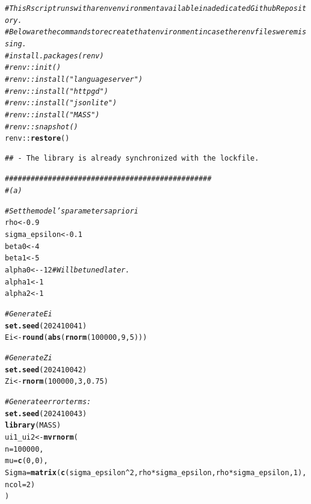 \documentclass{article}\usepackage[]{graphicx}\usepackage[]{xcolor}
\makeatletter
\newcommand{\hlnum}[1]{\textcolor[rgb]{0.686,0.059,0.569}{#1}}%
\newcommand{\hlcom}[1]{\textcolor[rgb]{0.678,0.584,0.686}{\textit{#1}}}%
\newcommand{\hlopt}[1]{\textcolor[rgb]{0,0,0}{#1}}%
\newcommand{\hldef}[1]{\textcolor[rgb]{0.345,0.345,0.345}{#1}}%
\newcommand{\hlkwb}[1]{\textcolor[rgb]{0.69,0.353,0.396}{#1}}%
\newcommand{\hlkwc}[1]{\textcolor[rgb]{0.333,0.667,0.333}{#1}}%
\newcommand{\hlkwd}[1]{\textcolor[rgb]{0.737,0.353,0.396}{\textbf{#1}}}%
\newenvironment{kframe}{%
 \def\at@end@of@kframe{}%
 \ifinner\ifhmode%
  \def\at@end@of@kframe{\end{minipage}}%
  \begin{minipage}{\columnwidth}%
 \fi\fi%
 \def\FrameCommand##1{\hskip\@totalleftmargin \hskip-\fboxsep
 \colorbox{shadecolor}{##1}\hskip-\fboxsep
     \hskip-\linewidth \hskip-\@totalleftmargin \hskip\columnwidth}%
 \MakeFramed {\advance\hsize-\width
   \@totalleftmargin\z@ \linewidth\hsize
   \@setminipage}}%
 {\par\unskip\endMakeFramed%
 \at@end@of@kframe}
\newenvironment{knitrout}{}{} %
\makeatother
\begin{document}
\begin{knitrout}
\color{fgcolor}\begin{kframe}
\begin{alltt}
\hlcom{# This R script runs with a renv environment available in a dedicated Github Repository.}
\hlcom{# Below are the commands to recreate that environment in case the renv files were missing.}
\hlcom{#install.packages(renv)}
\hlcom{#renv::init()}
\hlcom{#renv::install("languageserver")}
\hlcom{#renv::install("httpgd")}
\hlcom{#renv::install("jsonlite")}
\hlcom{#renv::install("MASS")}
\hlcom{#renv::snapshot()}
\hldef{renv}\hlopt{::}\hlkwd{restore}\hldef{()}
\end{alltt}
\begin{verbatim}
## - The library is already synchronized with the lockfile.
\end{verbatim}
\begin{alltt}
\hlcom{################################################}
\hlcom{# (a)}

\hlcom{# Set the model's parameters a priori}
\hldef{rho}           \hlkwb{<-} \hlnum{0.9}
\hldef{sigma_epsilon} \hlkwb{<-} \hlnum{0.1}
\hldef{beta0}         \hlkwb{<-} \hlnum{4}
\hldef{beta1}         \hlkwb{<-} \hlnum{5}
\hldef{alpha0}        \hlkwb{<-} \hlopt{-}\hlnum{12} \hlcom{# Will be tuned later.}
\hldef{alpha1}        \hlkwb{<-} \hlnum{1}
\hldef{alpha2}        \hlkwb{<-} \hlnum{1}

\hlcom{# Generate Ei}
\hlkwd{set.seed}\hldef{(}\hlnum{202410041}\hldef{)}
\hldef{Ei} \hlkwb{<-} \hlkwd{round}\hldef{(}\hlkwd{abs}\hldef{(}\hlkwd{rnorm}\hldef{(}\hlnum{100000}\hldef{,} \hlnum{9}\hldef{,} \hlnum{5}\hldef{)))}

\hlcom{# Generate Zi}
\hlkwd{set.seed}\hldef{(}\hlnum{202410042}\hldef{)}
\hldef{Zi} \hlkwb{<-} \hlkwd{rnorm}\hldef{(}\hlnum{100000}\hldef{,} \hlnum{3}\hldef{,} \hlnum{0.75}\hldef{)}

\hlcom{# Generate error terms:}
\hlkwd{set.seed}\hldef{(}\hlnum{202410043}\hldef{)}
\hlkwd{library}\hldef{(MASS)}
\hldef{ui1_ui2} \hlkwb{<-} \hlkwd{mvrnorm}\hldef{(}
           \hlkwc{n} \hldef{=} \hlnum{100000}\hldef{,}
           \hlkwc{mu} \hldef{=} \hlkwd{c}\hldef{(}\hlnum{0}\hldef{,} \hlnum{0}\hldef{),}
           \hlkwc{Sigma} \hldef{=} \hlkwd{matrix}\hldef{(}\hlkwd{c}\hldef{(sigma_epsilon}\hlopt{^}\hlnum{2}\hldef{, rho}\hlopt{*}\hldef{sigma_epsilon, rho}\hlopt{*}\hldef{sigma_epsilon,} \hlnum{1}\hldef{),}
                          \hlkwc{ncol} \hldef{=} \hlnum{2}\hldef{)}
                  \hldef{)}


\end{alltt}
\end{kframe}
\end{knitrout}
\end{document}
